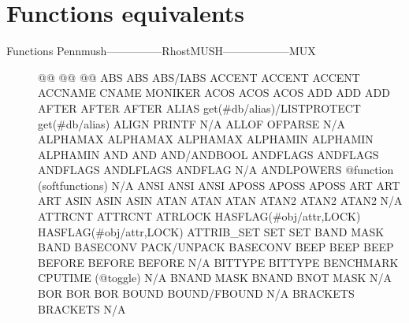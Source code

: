 \documentclass[letterpaper,10pt,english]{sphinxmanual}
\begin{document}
\section{Functions equivalents}
\label{\detokenize{31-comparison:functions-equivalents}}\begin{description}
\item[{Functions Pennmush—————\sphinxhyphen{}RhostMUSH——————\textendash{}MUX}] \leavevmode
\sphinxAtStartPar
@@                      @@                           @@
ABS                     ABS                          ABS/IABS
ACCENT                  ACCENT                       ACCENT
ACCNAME                 CNAME                        MONIKER
ACOS                    ACOS                         ACOS
ADD                     ADD                          ADD
AFTER                   AFTER                        AFTER
ALIAS                   get(\#db/alias)/LISTPROTECT   get(\#db/alias)
ALIGN                   PRINTF                       N/A
ALLOF                   OFPARSE                      N/A
ALPHAMAX                ALPHAMAX                     ALPHAMAX
ALPHAMIN                ALPHAMIN                     ALPHAMIN
AND                     AND                          AND/ANDBOOL
ANDFLAGS                ANDFLAGS                     ANDFLAGS
ANDLFLAGS               ANDFLAG                      N/A
ANDLPOWERS              @function (softfunctions)    N/A
ANSI                    ANSI                         ANSI
APOSS                   APOSS                        APOSS
ART                     ART                          ART
ASIN                    ASIN                         ASIN
ATAN                    ATAN                         ATAN
ATAN2                   ATAN2                        ATAN2
N/A                     ATTRCNT                      ATTRCNT
ATRLOCK                 HASFLAG(\#obj/attr,LOCK)      HASFLAG(\#obj/attr,LOCK)
ATTRIB\_SET              SET                          SET
BAND                    MASK                         BAND
BASECONV                PACK/UNPACK                  BASECONV
BEEP                    BEEP                         BEEP
BEFORE                  BEFORE                       BEFORE
N/A                     BITTYPE                      BITTYPE
BENCHMARK               CPUTIME (@toggle)            N/A
BNAND                   MASK                         BNAND
BNOT                    MASK                         N/A
BOR                     BOR                          BOR
BOUND                   BOUND/FBOUND                 N/A
BRACKETS                BRACKETS                     N/A

\end{description}
\end{document}
